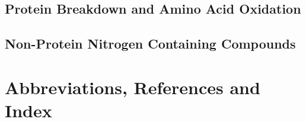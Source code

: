 \documentclass{tufte-book}
\begin{document}
\chapter{Protein Breakdown and Amino Acid Oxidation}\label{ch:protein-oxidation}


\chapter{Non-Protein Nitrogen Containing Compounds}
\label{ch:nitrogen-containing-compounds}



\backmatter
\part{Abbreviations, References and Index}



\renewcommand{\nomname}{List of Abbreviations}
%
%
\makeatletter
\newlength{\@nom@labelwidth}
\setlength{\@nom@labelwidth}{3.5cm}

\newif\if@innomenclature
\@innomenclaturefalse
\end{document}
